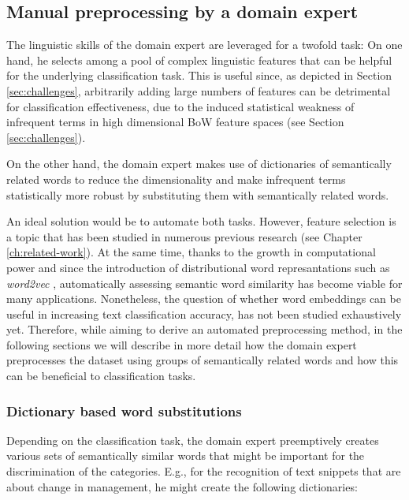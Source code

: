 \subsection{Manual preprocessing by a domain expert}
 
The linguistic skills of the domain expert are leveraged for a twofold task:
On one hand, he selects among a pool of complex linguistic features that can be
helpful for the underlying classification task. This is useful since, as 
depicted in Section \ref{sec:challenges}, arbitrarily adding large numbers of
features can be detrimental for classification effectiveness, due to the induced 
statistical weakness of infrequent terms in high dimensional BoW feature spaces
(see Section \ref{sec:challenges}).

On the other hand, the domain expert makes use of dictionaries of semantically
related words to reduce the dimensionality and make infrequent terms
statistically more robust by substituting them with semantically related words. 

An ideal solution would be to automate both tasks. However, feature selection is
a topic that has been studied in numerous previous research (see Chapter
\ref{ch:related-work}). At the same time, thanks to the growth in
computational power and since the introduction of distributional
word represantations such as \emph{word2vec} \cite{mikolov2013distributed}, automatically
assessing semantic word similarity has become viable for many applications.
Nonetheless, the question of whether word embeddings can be useful in increasing
text classification accuracy, has not been studied exhaustively yet. Therefore,
while aiming to derive an automated preprocessing method, in the following
sections we will describe in more detail how the domain expert preprocesses 
the dataset using groups of semantically related words and how this
can be beneficial to classification tasks.

\subsubsection{Dictionary based word substitutions}
\label{ssec:dict-based-lex-sub}

Depending on the classification task, the domain expert preemptively creates 
various sets of semantically similar words that might be important for the
discrimination of the categories. E.g., for the recognition of text snippets
that are about change in management, he might create the following
dictionaries:

